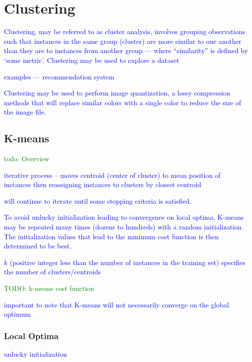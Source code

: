 \section{Clustering}

\textcolor{blue}{Clustering, may be referred to as cluster analysis, involves grouping observations such that instances in the same group (cluster) are more similar to one another than they are to instances from another group --- where ``similarity'' is defined by `some metric'. Clustering may be used to explore a dataset}

\textcolor{blue}{examples --- recommendation system}

\textcolor{blue}{Clustering may be used to perform {image quantization}, a lossy compression methods that will replace similar colors with a single color to reduce the size of the image file.}

\subsection{K-means}

\textcolor{green}{todo: Overview}

\textcolor{blue}{iterative process -- moves centroid (center of cluster) to mean position of instances then reassigning instances to clusters by closest centroid}

\textcolor{blue}{will continue to iterate until some stopping criteria is satisfied.}

\textcolor{blue}{To avoid unlucky initialization leading to convergence on local optima, K-means may be repeated many times (dozens to hundreds) with a random initialization. The initialization values that lead to the minimum cost function is then determined to be best.}

\textcolor{blue}{$k$ (positive integer less than the number of instances in the training set) specifies the number of clusters/centroids}

\textcolor{green}{TODO: k-means cost function}

\textcolor{blue}{important to note that K-means will not necessarily converge on the global optimum}

\subsubsection{Local Optima}

\textcolor{blue}{unlucky initialization}

